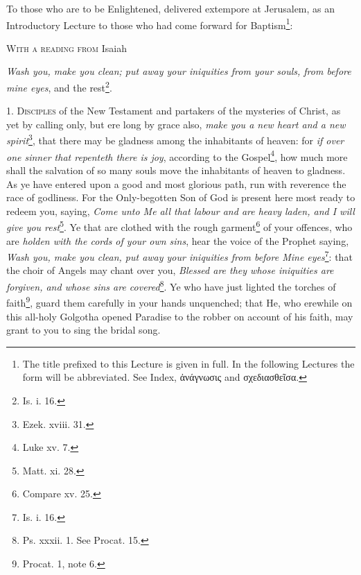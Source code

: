 To those who are to be Enlightened, delivered extempore at Jerusalem, as an Introductory Lecture to those who had come forward for Baptism\footnote{The title prefixed to this Lecture is given in full. In the following Lectures the form will be abbreviated. See Index, \textgreek{ἀνάγνωσις} and \textgreek{σχεδιασθεῖσα}.}:

\textsc{With a reading from} Isaiah

\emph{Wash you, make you clean; put away your iniquities from your souls, from before mine eyes}, and the rest\footnote{Is. i. 16.}.

1. \textsc{Disciples} of the New Testament and partakers of the mysteries of Christ, as yet by calling only, but ere long by grace also, \emph{make you a new heart and a new spirit}\footnote{Ezek. xviii. 31.}, that there may be gladness among the inhabitants of heaven: for \emph{if over one sinner that repenteth there is joy}, according to the Gospel\footnote{Luke xv. 7.}, how much more shall the salvation of so many souls move the inhabitants of heaven to gladness. As ye have entered upon a good and most glorious path, run with reverence the race of godliness. For the Only-begotten Son of God is present here most ready to redeem you, saying, \emph{Come unto Me all that labour and are heavy laden, and I will give you rest}\footnote{Matt. xi. 28.}. Ye that are clothed with the rough garment\footnote{Compare xv. 25.} of your offences, who are \emph{holden with the cords of your own sins}, hear the voice of the Prophet saying, \emph{Wash you, make you clean, put away your iniquities from before Mine eyes}\footnote{Is. i. 16.}: that the choir of Angels may chant over you, \emph{Blessed are they whose iniquities are forgiven, and whose sins are covered}\footnote{Ps. xxxii. 1. See Procat. 15.}. Ye who have just lighted the torches of faith\footnote{Procat. 1, note 6.}, guard them carefully in your hands unquenched; that He, who erewhile on this all-holy Golgotha opened Paradise to the robber on account of his faith, may grant to you to sing the bridal song.


